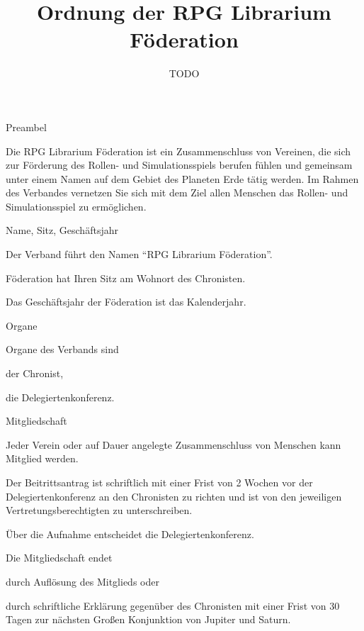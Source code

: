 \documentclass[11pt,a4paper,twoside,openany,article]{memoir}
\title{Ordnung der RPG Librarium Föderation}
\date{TODO}
\begin{document}
  \maketitle
  \sloppy
\begin{para}{Preambel}
\label{p:preambel}
\item Die RPG Librarium Föderation ist ein Zusammenschluss von Vereinen, die sich zur Förderung des Rollen- und Simulationsspiels berufen fühlen und gemeinsam unter einem Namen auf dem Gebiet des Planeten Erde tätig werden. Im Rahmen des Verbandes vernetzen Sie sich mit dem Ziel allen Menschen  das Rollen- und Simulationsspiel zu ermöglichen.
\end{para}

\begin{para}{Name, Sitz, Geschäftsjahr}
\label{p:name}
\item Der Verband führt den Namen \enquote{RPG Librarium Föderation}.
\item Föderation hat Ihren Sitz am Wohnort des Chronisten.
\item Das Geschäftsjahr der Föderation ist das Kalenderjahr.
\end{para}

\begin{para}{Organe}
\label{p:organe}
\item Organe des Verbands sind
    \begin{subpara}
    \item der Chronist, 
    \item die Delegiertenkonferenz.
    \end{subpara}
\end{para}

\begin{para}{Mitgliedschaft}
\label{p:mitgliedschaft}
\item Jeder Verein oder auf Dauer angelegte Zusammenschluss von Menschen kann Mitglied werden.
\item Der Beitrittsantrag ist schriftlich mit einer Frist von 2 Wochen vor der Delegiertenkonferenz an den Chronisten zu richten und ist von den jeweiligen Vertretungsberechtigten zu unterschreiben.
\item Über die Aufnahme entscheidet die Delegiertenkonferenz.
\item Die Mitgliedschaft endet 
    \begin{subpara}
    \item durch Auflösung des Mitglieds oder
    \item durch schriftliche Erklärung gegenüber des Chronisten mit einer Frist von 30 Tagen zur nächsten Großen Konjunktion von Jupiter und Saturn.
    \end{subpara}
\end{para}
\end{document}
